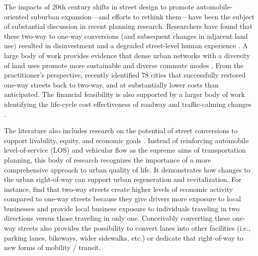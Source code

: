 \documentclass{article}
\begin{document}
The impacts of 20th century shifts in street design to promote automobile-oriented suburban expansion---and efforts to rethink them---have been the subject of substantial discussion in recent planning research. Researchers have found that these two-way to one-way conversions (and subsequent changes in adjacent land use) resulted in disinvestment and a degraded street-level human experience \citep{cervero_travel_1997,leinberger_walk_2012}. A large body of work provides evidence that dense urban networks with a diversity of land uses promote more sustainable and diverse commute modes \citep{ewing_travel_2010,frank_many_2006,frederick_commute_2018}. From the practitioner's perspective, \citet{speck_walkable_2018} recently identified 78 cities that successfully restored one-way streets back to two-way, and at substantially lower costs than anticipated. The financial feasibility is also supported by a larger body of work identifying the life-cycle cost effectiveness of roadway and traffic-calming changes \citep{noland_costs_2015}.

The literature also includes research on the potential of street conversions to support livability, equity, and economic goals \citep{riggs_two-way_2016,riggs_economic_2017, riggs_economic_2018}. Instead of reinforcing automobile level-of-service (LOS) and vehicular flow as the supreme aims of transportation planning, this body of research recognizes the importance of a more comprehensive approach to urban quality of life. It demonstrates how changes to the urban right-of-way can support urban regeneration and revitalization. For instance, \citet{riggs_two-way_2016} find that two-way streets create higher levels of economic activity compared to one-way streets because they give drivers more exposure to local businesses and provide local business exposure to individuals traveling in two directions versus those traveling in only one. Conceivably converting these one-way streets also provides the possibility to convert lanes into other facilities (i.e., parking lanes, bikeways, wider sidewalks, etc.) or dedicate that right-of-way to new forms of mobility / transit.
\end{document}
